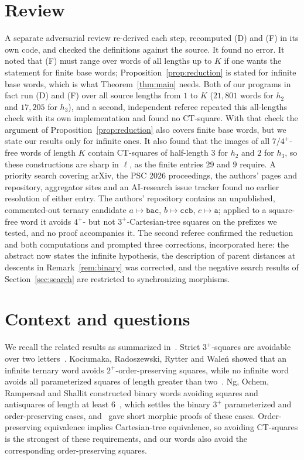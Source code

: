 \documentclass[11pt]{amsart}
\theoremstyle{definition}
\theoremstyle{remark}
\newcommand{\tw}{\mathtt}
\begin{document}
\section{Review}\label{sec:review}

A separate adversarial review re-derived each step, recomputed (D) and (F) in its own code, and checked the definitions against the source. It found no error. It noted that (F) must range over words of all lengths up to $K$ if one wants the statement for finite base words; Proposition~\ref{prop:reduction} is stated for infinite base words, which is what Theorem~\ref{thm:main} needs. Both of our programs in fact run (D) and (F) over all source lengths from $1$ to $K$ ($21{,}801$ words for $h_2$ and $17{,}205$ for $h_3$), and a second, independent referee repeated this all-lengths check with its own implementation and found no CT-square. With that check the argument of Proposition~\ref{prop:reduction} also covers finite base words, but we state our results only for infinite ones. It also found that the images of all $7/4^+$-free words of length $K$ contain CT-squares of half-length $3$ for $h_2$ and $2$ for $h_3$, so these constructions are sharp in $\ell$, as the finite entries $29$ and $9$ require. A priority search covering arXiv, the PSC 2026 proceedings, the authors' pages and repository, aggregator sites and an AI-research issue tracker found no earlier resolution of either entry. The authors' repository contains an unpublished, commented-out ternary candidate $a\mapsto\tw{bac}$, $b\mapsto\tw{ccb}$, $c\mapsto\tw{a}$; applied to a square-free word it avoids $4^+$- but not $3^+$-Cartesian-tree squares on the prefixes we tested, and no proof accompanies it. The second referee confirmed the reduction and both computations and prompted three corrections, incorporated here: the abstract now states the infinite hypothesis, the description of parent distances at descents in Remark~\ref{rem:binary} was corrected, and the negative search results of Section~\ref{sec:search} are restricted to synchronizing morphisms.

\section{Context and questions}

We recall the related results as summarized in~\cite{SMKI2026}. Strict $3^+$-squares are avoidable over two letters~\cite{EJS1974}. Kociumaka, Radoszewski, Rytter and Wale\'n showed that an infinite ternary word avoids $2^+$-order-preserving squares, while no infinite word avoids all parameterized squares of length greater than two~\cite{KRRW2016}. Ng, Ochem, Rampersad and Shallit constructed binary words avoiding squares and antisquares of length at least $6$~\cite{NORS2019}, which settles the binary $3^+$ parameterized and order-preserving cases, and~\cite{SMKI2026} gave short morphic proofs of these cases. Order-preserving equivalence implies Cartesian-tree equivalence, so avoiding CT-squares is the strongest of these requirements, and our words also avoid the corresponding order-preserving squares.
\end{document}
